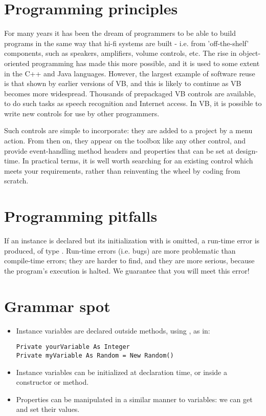 	\section{Programming principles}
		For many years it has been the dream of programmers to be able to build programs in the same way that hi-fi systems are built - i.e. from 'off-the-shelf' components, such as speakers, amplifiers, volume controls, etc. The rise in object-oriented programming has made this more possible, and it is used to some extent in the C++ and Java languages. However, the largest example of software reuse is that shown by earlier versions of VB, and this is likely to continue as VB becomes more widespread. Thousands of prepackaged VB controls are available, to do such tasks as speech recognition and Internet access. In VB, it is possible to write new controls for use by other programmers.
		
		Such controls are simple to incorporate: they are added to a project by a menu action. From then on, they appear on the toolbox like any other control, and provide event-handling method headers and properties that can be set at design-time. In practical terms, it is well worth searching for an existing control which meets your requirements, rather than reinventing the wheel by coding from scratch.


	\section{Programming pitfalls}
	If an instance is declared but its initialization with  is omitted, a run-time error is produced, of type . Run-time errors (i.e. bugs) are more problematic than compile-time errors; they are harder to find, and they are more serious, because the program's execution is halted. We guarantee that you will meet this error!


	\section{Grammar spot}
		\begin{itemize}
			\item Instance variables are declared outside methods, using , as in:
				\begin{lstlisting}
Private yourVariable As Integer
Private myVariable As Random = New Random()
				\end{lstlisting}
			\item Instance variables can be initialized at declaration time, or inside a constructor or method.
			\item Properties can be manipulated in a similar manner to variables: we can get and set their values.
		\end{itemize}


